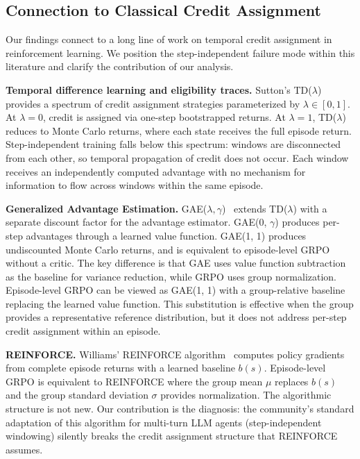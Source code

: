 \subsection{Connection to Classical Credit Assignment}
\label{sec:classical_connection}

Our findings connect to a long line of work on temporal credit assignment in reinforcement learning. We position the step-independent failure mode within this literature and clarify the contribution of our analysis.

\textbf{Temporal difference learning and eligibility traces.} Sutton's TD($\lambda$)~\cite{sutton1988td} provides a spectrum of credit assignment strategies parameterized by $\lambda \in [0,1]$. At $\lambda = 0$, credit is assigned via one-step bootstrapped returns. At $\lambda = 1$, TD($\lambda$) reduces to Monte Carlo returns, where each state receives the full episode return. Step-independent training falls below this spectrum: windows are disconnected from each other, so temporal propagation of credit does not occur. Each window receives an independently computed advantage with no mechanism for information to flow across windows within the same episode.

\textbf{Generalized Advantage Estimation.} GAE($\lambda, \gamma$)~\cite{schulman2016gae} extends TD($\lambda$) with a separate discount factor for the advantage estimator. GAE(0, $\gamma$) produces per-step advantages through a learned value function. GAE(1, 1) produces undiscounted Monte Carlo returns, and is equivalent to episode-level GRPO without a critic. The key difference is that GAE uses value function subtraction as the baseline for variance reduction, while GRPO uses group normalization. Episode-level GRPO can be viewed as GAE(1, 1) with a group-relative baseline replacing the learned value function. This substitution is effective when the group provides a representative reference distribution, but it does not address per-step credit assignment within an episode.

\textbf{REINFORCE.} Williams' REINFORCE algorithm~\cite{williams1992reinforce} computes policy gradients from complete episode returns with a learned baseline $b(s)$. Episode-level GRPO is equivalent to REINFORCE where the group mean $\mu$ replaces $b(s)$ and the group standard deviation $\sigma$ provides normalization. The algorithmic structure is not new. Our contribution is the diagnosis: the community's standard adaptation of this algorithm for multi-turn LLM agents (step-independent windowing) silently breaks the credit assignment structure that REINFORCE assumes.

